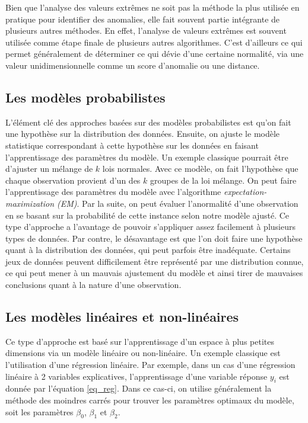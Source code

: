 Bien que l'analyse des valeurs extrêmes ne soit pas la méthode la plus utilisée en pratique pour identifier des anomalies, elle fait souvent partie intégrante de plusieurs autres méthodes. En effet, l'analyse de valeurs extrêmes est souvent utilisée comme étape finale de plusieurs autres algorithmes. C'est d'ailleurs ce qui permet généralement de déterminer ce qui dévie d'une certaine normalité, via une valeur unidimensionnelle comme un score d'anomalie ou une distance.


\subsection{Les modèles probabilistes}

L'élément clé des approches basées sur des modèles probabilistes  est qu'on fait une hypothèse sur la distribution des données. Ensuite, on ajuste le modèle statistique correspondant à cette hypothèse sur les données en faisant l'apprentissage des paramètres du modèle. Un exemple classique pourrait être d'ajuster un mélange de $k$ lois normales. Avec ce modèle, on fait l'hypothèse que chaque observation provient d'un des $k$ groupes de la loi mélange. On peut faire l'apprentissage des paramètres du modèle avec l'algorithme \textit{expectation-maximization (EM)}. Par la suite, on peut évaluer l'anormalité d'une observation en se basant sur la probabilité de cette instance selon notre modèle ajusté. Ce type d'approche a l'avantage de pouvoir s'appliquer assez facilement à plusieurs types de données. Par contre, le désavantage est que l'on doit faire une hypothèse quant à la distribution des données, qui peut parfois être inadéquate. Certains jeux de données peuvent difficilement être représenté par une distribution connue, ce qui peut mener à un mauvais ajustement du modèle et ainsi tirer de mauvaises conclusions quant à la nature d'une observation.

\subsection{Les modèles linéaires et non-linéaires} \label{soussec:linear}

Ce type d'approche est basé sur l'apprentissage d'un espace à plus petites dimensions via un modèle linéaire ou non-linéaire. Un exemple classique est l'utilisation d'une régression linéaire. Par exemple, dans un cas d'une régression linéaire à 2 variables explicatives, l'apprentissage d'une variable réponse $y_i$ est donnée par l'équation \ref{eq_reg}. Dans ce cas-ci, on utilise généralement la méthode des moindres carrés pour trouver les paramètres optimaux du modèle, soit les paramètres $\beta_0$, $\beta_1$ et $\beta_2$.

